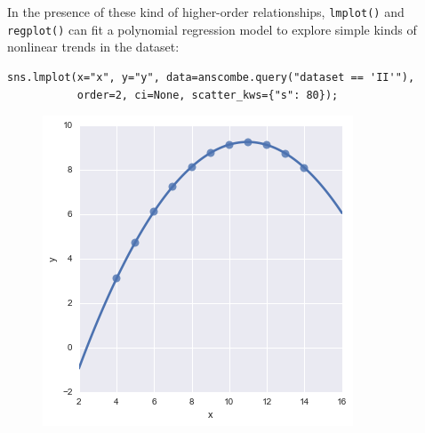\documentclass{beamer}
\begin{document}
\begin{frame}[fragile]
	\large	
In the presence of these kind of higher-order relationships, \texttt{lmplot()} and \texttt{regplot()} can fit a polynomial regression model to explore simple kinds of nonlinear trends in the dataset:
\begin{framed}
	\begin{verbatim}
sns.lmplot(x="x", y="y", data=anscombe.query("dataset == 'II'"),
           order=2, ci=None, scatter_kws={"s": 80});
               \end{verbatim}
            \end{framed}
\begin{figure}
	\centering
	\includegraphics[width=0.7\linewidth]{images/regression_23_0}

\end{figure}

\end{frame}
\end{document}
